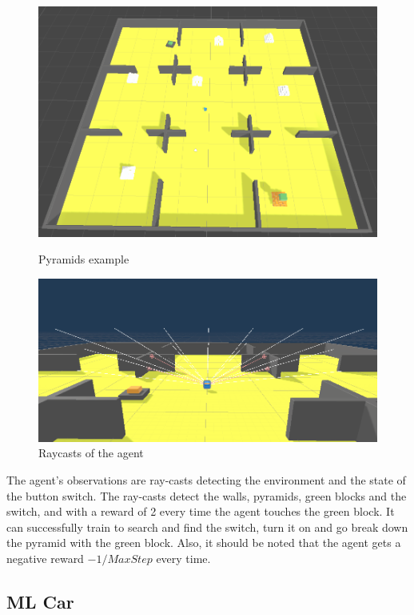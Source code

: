 \documentclass[a4paper, 12pt]{book}
\begin{document}
\begin{figure}[ht]
  \includegraphics[width=\linewidth]{Images/PyramidsExample.png}
  \caption{Pyramids example \cite{MLAgents}}\label{fig:PyramidPicture}
\endminipage\hfill
{}
  \includegraphics[width=\linewidth]{Images/PyramidsRaycast.png}
  \caption{Raycasts of the agent}\label{fig:PyramidRaycasts}
\endminipage\hfill
\label{PyradmidsExample}
\end{figure}

The agent's observations are ray-casts detecting the environment and the state of the button switch. The ray-casts detect the walls, pyramids, green blocks and the switch, and with a reward of 2 every time the agent touches the green block. It can successfully train to search and find the switch, turn it on and go break down the pyramid with the green block. Also, it should be noted that the agent gets a negative reward $ -1 / MaxStep $ every time.

\subsection{ML Car}
\end{document}
